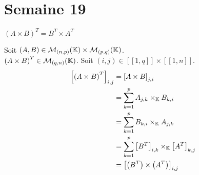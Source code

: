 \documentclass{article}
\renewenvironment{question_kholle}[2][ ]
{
	\subsection{\texorpdfstring{#2}{}}
	\notblank{#1}
	{
		\noindent #1
		\bigbreak
	}
	{}
	\begin{proof}
}
{
	\end{proof}
}
\begin{document}
\pagebreak\section{Semaine 19}

  {$\left(A \times B\right)^T = B^T \times A^T$}

  Soit $(A, B) \in \mathcal{M}_{(n,p)}(\mathbb K) \times \mathcal{M}_{(p,q)}(\mathbb K)$. \\
  $\left(A \times B\right)^T \in \mathcal{M}_{(q,n)}(\mathbb K)$. Soit $(i, j) \in [\![1,q]\!] \!\times\! [\![1,n]\!]$.
  \begin{equation*}
    \begin{aligned}
      \left[ \left(A \times B\right)^T \right]_{i,j}
       & = \left[A \times B\right]_{j,i}                                          \\
       & = \sum_{k=1}^{p} A_{j,k} \times_{\mathbb K} B_{k,i}                               \\
       & = \sum_{k=1}^{p} B_{k,i} \times_{\mathbb K} A_{j,k}                               \\
       & = \sum_{k=1}^{p} \left[B^T\right]_{i,k} \times_{\mathbb K} \left[A^T\right]_{k,j} \\
       & = \left[ \left(B^T\right) \times \left(A^T\right) \right]_{i,j}
    \end{aligned}
  \end{equation*}
\end{question_kholle}
\end{document}
